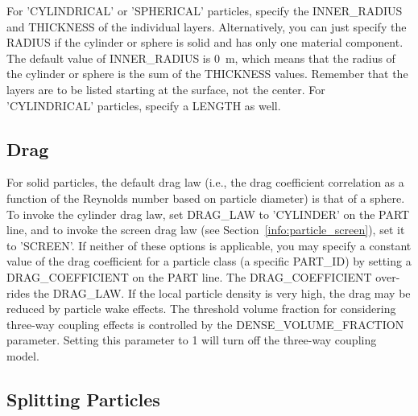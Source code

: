 \documentclass[11pt]{book}
\begin{document}
For  {\ct 'CYLINDRICAL'} or {\ct 'SPHERICAL'} particles, specify the {\ct INNER\_RADIUS} and {\ct THICKNESS} of the individual layers. Alternatively, you can just specify the {\ct RADIUS} if the cylinder or sphere is solid and has only one material component. The default value of {\ct INNER\_RADIUS} is 0~m, which means that the radius of the cylinder or sphere is the sum of the {\ct THICKNESS} values. Remember that the layers are to be listed starting at the surface, not the center. For {\ct 'CYLINDRICAL'} particles, specify a {\ct LENGTH} as well.




\subsection{Drag}
\label{info:particle_drag}

For solid particles, the default drag law (i.e., the drag coefficient correlation as a function of the Reynolds number based on particle diameter) is that of a sphere. To invoke the cylinder drag law, set {\ct DRAG\_LAW} to {\ct 'CYLINDER'} on the {\ct PART} line, and to invoke the screen drag law (see Section~\ref{info:particle_screen}), set it to {\ct 'SCREEN'}.  If neither of these options is applicable, you may specify a constant value of the drag coefficient for a particle class (a specific {\ct PART\_ID}) by setting a {\ct DRAG\_COEFFICIENT} on the {\ct PART} line. The {\ct DRAG\_COEFFICIENT} over-rides the {\ct DRAG\_LAW}. If the local particle density is very high, the drag may be reduced by particle wake effects. The threshold volume fraction for considering three-way coupling effects is controlled by the {\ct DENSE\_VOLUME\_FRACTION} parameter. Setting this parameter to 1 will turn off the three-way coupling model.

\subsection{Splitting Particles}
\label{info:particle_split}
\end{document}
